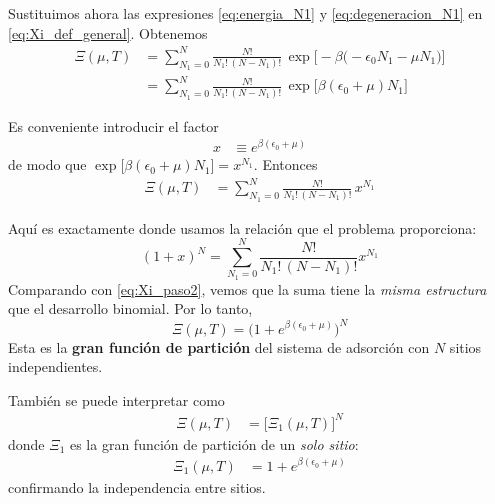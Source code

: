 \documentclass{article}
\begin{document}

Sustituimos ahora las expresiones \eqref{eq:energia_N1} y \eqref{eq:degeneracion_N1} en \eqref{eq:Xi_def_general}. Obtenemos
\begin{equation}
\begin{split}
\Xi(\mu,T)
&= \sum_{N_{1}=0}^{N}
\frac{N!}{N_{1}!\,(N-N_{1})!}\,
\exp\!\big[-\beta\big(-\epsilon_{0}N_{1} - \mu N_{1}\big)\big] \\[4pt]
&= \sum_{N_{1}=0}^{N}
\frac{N!}{N_{1}!\,(N-N_{1})!}\,
\exp\!\Big[\beta(\epsilon_{0} + \mu)N_{1}\Big]
\end{split}\label{eq:Xi_paso1}
\end{equation}

Es conveniente introducir el factor
\begin{equation}
\begin{split}
x &\equiv e^{\beta(\epsilon_{0}+\mu)}
\end{split}\label{eq:def_x}
\end{equation}
de modo que \(\exp\!\big[\beta(\epsilon_{0}+\mu)N_{1}\big] = x^{N_{1}}\). Entonces
\begin{equation}
\begin{split}
\Xi(\mu,T)
&= \sum_{N_{1}=0}^{N}
\frac{N!}{N_{1}!\,(N-N_{1})!}\, x^{N_{1}}
\end{split}\label{eq:Xi_paso2}
\end{equation}

Aquí es exactamente donde usamos la relación que el problema proporciona:
\[
(1+x)^{N} = \sum_{N_{1}=0}^{N} \frac{N!}{N_{1}!\,(N-N_{1})!} x^{N_{1}}
\]
Comparando con \eqref{eq:Xi_paso2}, vemos que la suma tiene la \emph{misma estructura} que el desarrollo binomial. Por lo tanto,
\begin{equation}
\boxed{
\Xi(\mu,T)
= \big(1 + e^{\beta(\epsilon_{0}+\mu)}\big)^{N}
}
\label{eq:Xi_final}
\end{equation}
Esta es la \textcolor{Cinnabar}{\textbf{gran función de partición}} del sistema de adsorción con \(N\) sitios independientes.

También se puede interpretar como
\begin{equation}
\begin{split}
\Xi(\mu,T)
&= \big[\Xi_{1}(\mu,T)\big]^{N}
\end{split}\label{eq:Xi_factorizada}
\end{equation}
donde \(\Xi_{1}\) es la gran función de partición de un \emph{solo sitio}:
\begin{equation}
\begin{split}
\Xi_{1}(\mu,T)
&= 1 + e^{\beta(\epsilon_{0}+\mu)}
\end{split}\label{eq:Xi1_final}
\end{equation}
confirmando la independencia entre sitios.
\end{document}
